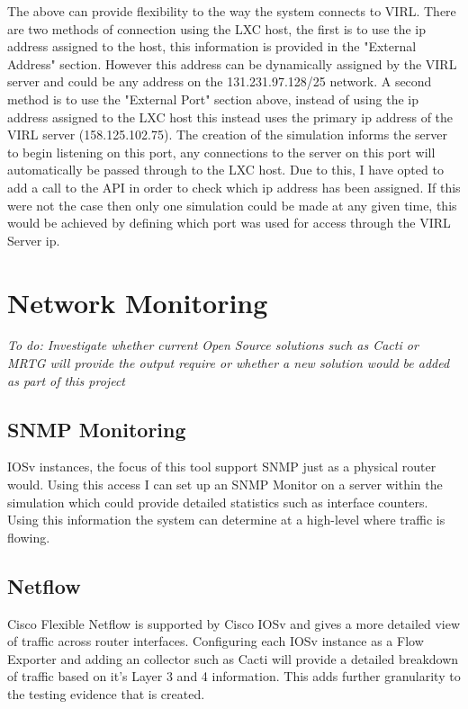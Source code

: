 \documentclass[11pt]{report}
\begin{document}
The above can provide flexibility to the way the system connects to VIRL. There are two methods of connection using the LXC host, the first is to use the ip address assigned to the host, this information is provided in the "External Address" section. However this address can be dynamically assigned by the VIRL server and could be any address on the 131.231.97.128/25 network. A second method is to use the "External Port" section above, instead of using the ip address assigned to the LXC host this instead uses the primary ip address of the VIRL server (158.125.102.75). The creation of the simulation informs the server to begin listening on this port, any connections to the server on this port will automatically be passed through to the LXC host. Due to this, I have opted to add a call to the API in order to check which ip address has been assigned. If this were not the case then only one simulation could be made at any given time, this would be achieved by defining which port was used for access through the VIRL Server ip.

\section{Network Monitoring}

\textit{To do: Investigate whether current Open Source solutions such as Cacti or MRTG will provide the output require or whether a new solution would be added as part of this project}

\subsection{SNMP Monitoring}

IOSv instances, the focus of this tool support SNMP just as a physical router would. Using this access I can set up an SNMP Monitor on a server within the simulation which could provide detailed statistics such as interface counters. Using this information the system can determine at a high-level where traffic is flowing.

\subsection{Netflow}

Cisco Flexible Netflow is supported by Cisco IOSv and gives a more detailed view of traffic across router interfaces. Configuring each IOSv instance as a Flow Exporter and adding an collector such as Cacti will provide a detailed breakdown of traffic based on it's Layer 3 and 4 information. This adds further granularity to the testing evidence that is created.
\end{document}

